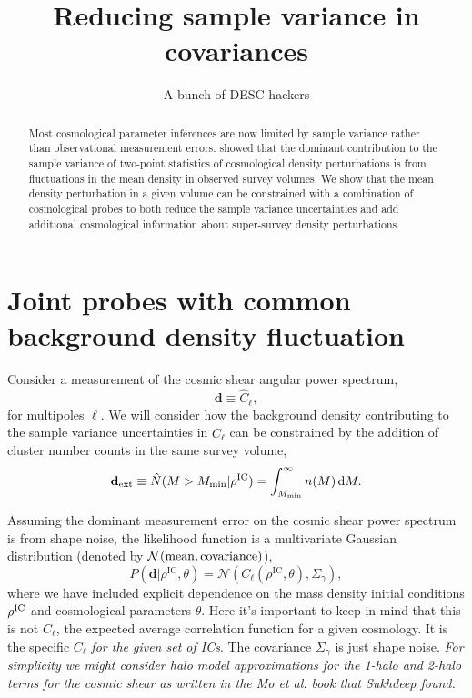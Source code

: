 \documentclass[preprint]{aastex}
\newcommand{\data}{\mathbf{d}}
\newcommand{\dataext}{\data_{\rm ext}}
\newcommand{\rhoic}{\rho^{\rm IC}}
\newcommand{\normdist}{\mathcal{N}}
\newcommand{\nhatclust}{\hat{N}}
\begin{document}
\title{Reducing sample variance in covariances}

\author{A bunch of DESC hackers}
\begin{abstract}
Most cosmological parameter inferences are now limited by sample variance rather than 
observational measurement errors. \citet{takada2013} showed that the dominant contribution 
to the sample variance of two-point statistics of cosmological density perturbations is from 
fluctuations in the mean density in observed survey volumes. 
We show that the mean density perturbation in a given volume can be constrained with a combination of 
cosmological probes to both reduce the sample variance uncertainties and add additional 
cosmological information about super-survey density perturbations.
\end{abstract}



\section{Joint probes with common background density fluctuation} %
\label{sec:joint_probes}

Consider a measurement of the cosmic shear angular power spectrum,
\begin{equation}
	\data \equiv \hat{C}_{\ell},
\end{equation}
for multipoles $\ell$.
We will consider how the background density contributing to the sample variance 
uncertainties in $\hat{C}_{\ell}$ can be constrained by the 
addition of cluster number counts in the same survey volume,
\begin{equation}
	\dataext \equiv \nhatclust(M>M_\text{min} | \rho^\text{IC}) =
	\int_{M_\text{min}}^{\infty} n(M)\,\mathrm{d}M.
\end{equation}

Assuming the dominant measurement error on the cosmic shear power spectrum is from shape noise,
the likelihood function is a multivariate Gaussian distribution (denoted by $\normdist({\rm mean}, {\rm covariance})$),
\begin{equation}
	P(\data|\rho^\text{IC},\theta) = \normdist(C_{\ell}(\rho^\text{IC},\theta), \Sigma_{\gamma}),
\end{equation}
where we have included explicit dependence on the mass density initial conditions $\rhoic$ 
and cosmological parameters $\theta$.
Here it's important to keep in mind that this is not $\bar{C}_{\ell}$, the expected average correlation
function for a given cosmology.  It is the specific $C_{\ell}$ {\em for the given set of ICs}. The
covariance $\Sigma_{\gamma}$ is just shape noise.  {\it For simplicity we might consider halo model
approximations for the 1-halo and 2-halo terms for the cosmic shear as written in the Mo et al. book
that Sukhdeep found.}
\end{document}
